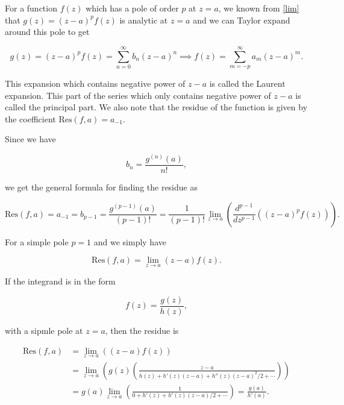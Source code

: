 \documentclass[english,a4paper,12pt]{report}
\begin{document}
For a function \(f(z)\) which has a pole of order \(p \) at \(z = a\), we known from \cref{lim} that \(g(z) = (z-a)^{p} f(z) \) is analytic at \(z  = a\) and we can Taylor expand around this pole to get

\begin{equation}
    g(z) = (z-a)^{p} f(z) =  \sum_{n=0}^{\infty} b_{n} (z-a)^{n} \implies f(z) = \sum_{m=-p}^{\infty} a_{m} (z-a)^{m}.   
\end{equation}

This expansion which contains negative power of \(z-a\) is called the Laurent expansion. This part of the series which only contains negative power of \(z-a\) is called the principal part. We also note that the residue of the function is given by the coefficient \(\text{Res}(f,a) = a_{-1} \). 

Since we have 

\begin{equation}
    b_{n} = \frac{g^{(n)}(a) }{n!},
\end{equation}

we get the general formula for finding the residue as 

\begin{equation}
    \text{Res}(f,a) = a_{-1} = b_{p-1} = \frac{g^{(p-1)}(a) }{(p-1)!} = \frac{1}{(p-1)!} \lim_{z \to a} \left( \frac{d^{p-1} }{dz^{p-1} } ((z-a)^{p}f(z) )  \right).
\end{equation}

For a simple pole \(p = 1\) and we simply have 

\begin{equation}
    \text{Res} (f,a) = \lim_{z \to a} (z-a)f(z). 
\end{equation}

If the integrand is in the form 

\begin{equation}
    f(z) = \frac{g(z)}{h(z)}, 
\end{equation}

with a sipmle pole at \(z = a\), then the residue is 

\begin{equation}
    \begin{aligned} 
    \text{Res}(f,a) &= \lim_{z \to a} \left( (z-a)f(z) \right)\\
    &= \lim_{z \to a} \left( g(z) \left( \frac{z-a}{h(z)+h'(z)(z-a)+h''(z)(z-a)^2/2 + \cdots }  \right) \right) \\
    &= g(a) \lim_{z \to a} \left( \frac{1}{0 + h'(z) + h'(z)(z-a)/2 + \cdots }  \right) = \frac{g(a)}{h'(a)}. 
    \end{aligned} 
\end{equation}
\end{document}
